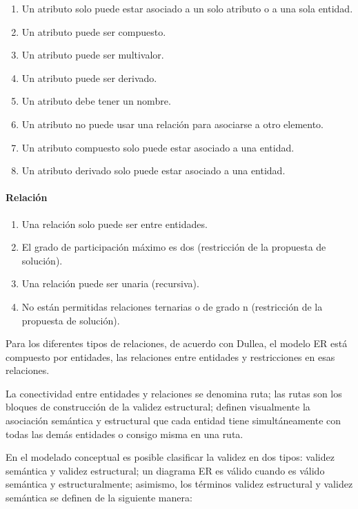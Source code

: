 \begin{enumerate}    
\item Un atributo solo puede estar asociado a un solo atributo o a una sola entidad.
\item Un atributo puede ser compuesto.
\item Un atributo puede ser multivalor.
\item Un atributo puede ser derivado.
\item Un atributo debe tener un nombre.
\item Un atributo no puede usar una relación para asociarse a otro elemento.
\item Un atributo compuesto solo puede estar asociado a una entidad.
\item Un atributo derivado solo puede estar asociado a una entidad.
\end{enumerate}

\paragraph*{Relación}

\begin{enumerate}
    \item Una relación solo puede ser entre entidades.
    \item El grado de participación máximo es dos (restricción de la propuesta de solución).
    \item Una relación puede ser unaria (recursiva).
    \item No están permitidas relaciones ternarias o de grado n (restricción de la propuesta de solución).
\end{enumerate}

Para los diferentes tipos de relaciones, de acuerdo con Dullea\cite{dullea_analysis_2003}, el modelo ER está compuesto por entidades, las relaciones entre entidades y restricciones en esas relaciones.


La conectividad entre entidades y relaciones se denomina ruta; las rutas son los bloques de construcción de la validez estructural; definen visualmente la asociación semántica y estructural que cada entidad tiene simultáneamente con todas las demás entidades o consigo misma en una ruta.

En el modelado conceptual es posible clasificar la validez en dos tipos: validez semántica y validez estructural; un diagrama ER es válido cuando es válido semántica y estructuralmente; asimismo, los términos validez estructural y validez semántica se definen de la siguiente manera:


